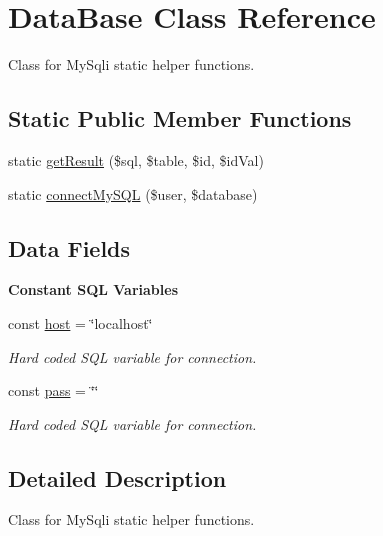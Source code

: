 \hypertarget{class_data_base}{\section{Data\-Base Class Reference}
\label{class_data_base}
}


Class for My\-Sqli static helper functions.  


\subsection*{Static Public Member Functions}
\begin{DoxyCompactItemize}
\item 
static \hyperlink{class_data_base_a2c79a02715a9f67b6f50f20a221fde39}{get\-Result} (\$sql, \$table, \$id, \$id\-Val)
\item 
static \hyperlink{class_data_base_ac35c457c4a3fd02713f4c793897e4d38}{connect\-My\-S\-Q\-L} (\$user, \$database)
\end{DoxyCompactItemize}
\subsection*{Data Fields}
\begin{Indent}{\bf Constant S\-Q\-L Variables}\par
\begin{DoxyCompactItemize}
\item 
const \hyperlink{class_data_base_a657433cc10254cb11103d5ca366a5a6d}{host} = \char`\"{}localhost\char`\"{}
\begin{DoxyCompactList}\small\item\em Hard coded S\-Q\-L variable for connection. \end{DoxyCompactList}\item 
const \hyperlink{class_data_base_afea42faad022b77d80bc1c081dad5815}{pass} = \char`\"{}\char`\"{}
\begin{DoxyCompactList}\small\item\em Hard coded S\-Q\-L variable for connection. \end{DoxyCompactList}\end{DoxyCompactItemize}
\end{Indent}


\subsection{Detailed Description}
Class for My\-Sqli static helper functions. 

